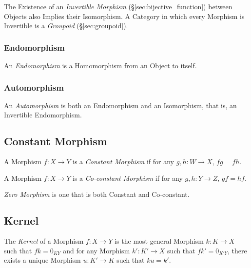 The Existence of an \emph{Invertible Morphism}
(\S\ref{sec:bijective_function}) between Objects also Implies their
Isomorphism. A Category in which every Morphism is Invertible is a
\emph{Groupoid} (\S\ref{sec:groupoid}).



\subsubsection{Endomorphism}

An \emph{Endomorphism} is a Homomorphism from an Object to itself.



\subsubsection{Automorphism}\label{sec:automorphism}

An \emph{Automorphism} is both an Endomorphism and an Isomorphism,
that is, an Invertible Endomorphism.



\subsection{Constant Morphism}\label{sec:constant_morphism}

A Morphism $f : X \rightarrow Y$ is a \emph{Constant Morphism} if for
any $g, h : W \rightarrow X$, $fg = fh$.

A Morphism $f : X \rightarrow Y$ is a \emph{Co-constant Morphism} if
for any $g, h : Y \rightarrow Z$, $gf = hf$.

\emph{Zero Morphism} is one that is both Constant and Co-constant.



\subsection{Kernel}\label{sec:morphism_kernel}

The \emph{Kernel} of a Morphism $f : X \rightarrow Y$ is the most
general Morphism $k : K \rightarrow X$ such that $fk = 0_{KY}$ and for
any Morphism $k' : K' \rightarrow X$ such that $fk' = 0_{K'Y}$, there
exists a unique Morphism $u : K' \rightarrow K$ such that $ku = k'$.



